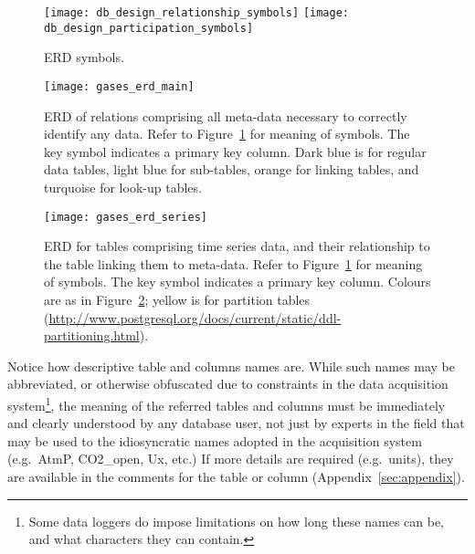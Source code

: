 \documentclass[12pt,letterpaper,titlepage,headings=small,numbers=noenddot]%
{scrartcl}
\begin{document}
\begin{figure}[!tbh]
  \begin{center}
    \texttt{[image: db\_design\_relationship\_symbols]}
    \texttt{[image: db\_design\_participation\_symbols]}
  \end{center}
  \caption{ERD symbols.}
  \label{fig:ERD-symbols}
\end{figure}

\begin{figure}[!tbh]
  \begin{center}
    \texttt{[image: gases\_erd\_main]}
  \end{center}
  \caption{ERD of relations comprising all meta-data necessary to correctly
    identify any data. Refer to Figure~\ref{fig:ERD-symbols} for meaning of
    symbols. The key symbol indicates a primary key column.  Dark blue is
    for regular data tables, light blue for sub-tables, orange for linking
    tables, and turquoise for look-up tables.}
  \label{fig:ERD-main}
\end{figure}

\begin{figure}[!tbh]
  \begin{center}
    \texttt{[image: gases\_erd\_series]}
  \end{center}
  \caption{ERD for tables comprising time series data, and their
    relationship to the table linking them to meta-data. Refer to
    Figure~\ref{fig:ERD-symbols} for meaning of symbols.  The key symbol
    indicates a primary key column.  Colours are as in
    Figure~\ref{fig:ERD-main}; yellow is for partition tables
    (\url{http://www.postgresql.org/docs/current/static/ddl-partitioning.html}).}
  \label{fig:ERD-series}
\end{figure}

Notice how descriptive table and columns names are.  While such names may
be abbreviated, or otherwise obfuscated due to constraints in the data
acquisition system\footnote{Some data loggers do impose limitations on how
  long these names can be, and what characters they can contain.}, the
meaning of the referred tables and columns must be immediately and clearly
understood by any database user, not just by experts in the field that may
be used to the idiosyncratic names adopted in the acquisition system
(e.g.~AtmP, CO2\_open, Ux, etc.)  If more details are required
(e.g.~units), they are available in the comments for the table or column
(Appendix~\ref{sec:appendix}).
\end{document}

